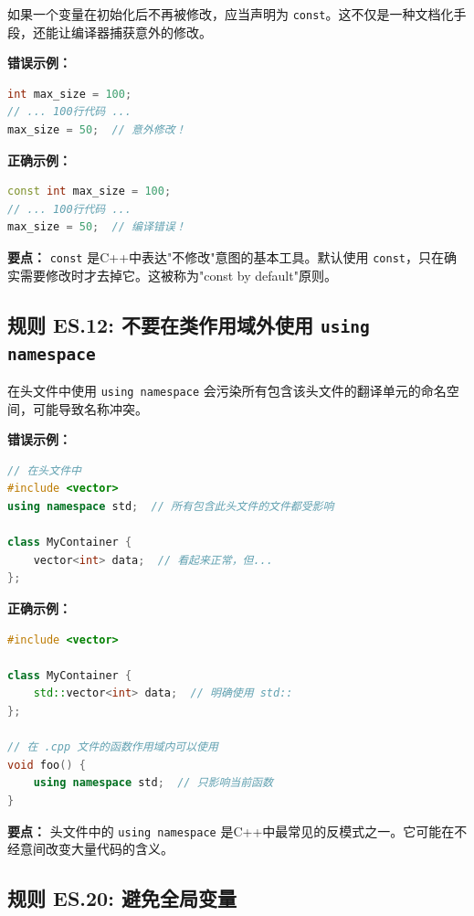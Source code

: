如果一个变量在初始化后不再被修改，应当声明为 \texttt{const}。这不仅是一种文档化手段，还能让编译器捕获意外的修改。

\textbf{错误示例：}

\begin{lstlisting}[language=C++]
int max_size = 100;
// ... 100行代码 ...
max_size = 50;  // 意外修改！
\end{lstlisting}

\textbf{正确示例：}

\begin{lstlisting}[language=C++]
const int max_size = 100;
// ... 100行代码 ...
max_size = 50;  // 编译错误！
\end{lstlisting}

\textbf{要点：} \texttt{const} 是C++中表达"不修改"意图的基本工具。默认使用 \texttt{const}，只在确实需要修改时才去掉它。这被称为"const by default"原则。

\subsection*{\textbf{规则 ES.12:} 不要在类作用域外使用 \texttt{using namespace}}

在头文件中使用 \texttt{using namespace} 会污染所有包含该头文件的翻译单元的命名空间，可能导致名称冲突。

\textbf{错误示例：}

\begin{lstlisting}[language=C++]
// 在头文件中
#include <vector>
using namespace std;  // 所有包含此头文件的文件都受影响

class MyContainer {
    vector<int> data;  // 看起来正常，但...
};
\end{lstlisting}

\textbf{正确示例：}

\begin{lstlisting}[language=C++]
#include <vector>

class MyContainer {
    std::vector<int> data;  // 明确使用 std::
};

// 在 .cpp 文件的函数作用域内可以使用
void foo() {
    using namespace std;  // 只影响当前函数
}
\end{lstlisting}

\textbf{要点：} 头文件中的 \texttt{using namespace} 是C++中最常见的反模式之一。它可能在不经意间改变大量代码的含义。

\subsection*{\textbf{规则 ES.20:} 避免全局变量}

